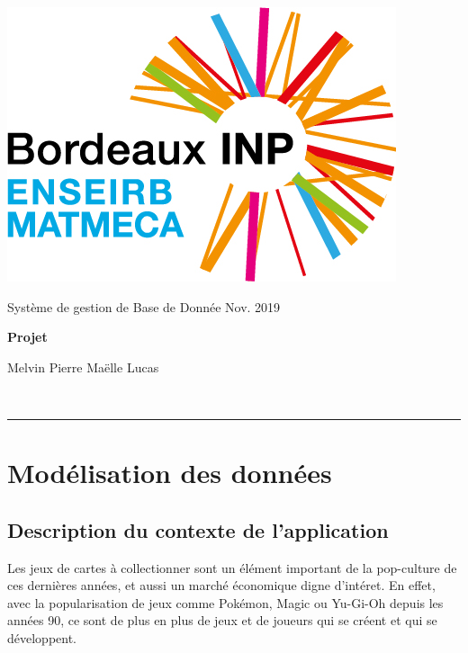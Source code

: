 \documentclass[a4paper,10.5pt]{article}
\begin{document}
\noindent
\begin{minipage}{0.20\textwidth}
\includegraphics[width=\textwidth]{logo}
\end{minipage}
\hfill
\begin{minipage}{0.71\textwidth}
Système de gestion de Base de Donnée \hfill Nov. 2019\\

\begin{center}
{\Large \textbf{Projet}}

\vspace{0.5em}
 \large Melvin  \quad Pierre  \quad Maëlle  \quad Lucas 
\end{center}\vspace{0.3em}


\end{minipage}\\

\noindent
\rule{\linewidth}{0.5mm}
\setcounter{section}{1}

\section{Modélisation des données}
\subsection{Description du contexte de l'application}

Les jeux de cartes à collectionner sont un élément important de la pop-culture de ces dernières années, et aussi un marché économique digne d'intéret. En effet, avec la popularisation de jeux comme Pokémon, Magic ou Yu-Gi-Oh depuis les années 90, ce sont de plus en plus de jeux et de joueurs qui se créent et qui se développent.
\end{document}
